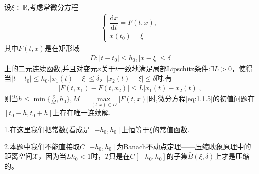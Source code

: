 \documentclass[../../main.tex]{subfiles}
\begin{document}
\begin{theorem}[常微分方程初值问题解的局部存在唯一性]\label{theorem:常微分方程初值问题解的局部存在唯一性}
设$\xi \in \mathbb{R}$,考虑常微分方程
\begin{align}
\label{eq:1.1.5}
\begin{cases}
\dfrac{\mathrm{d}x}{\mathrm{d}t} = F(t,x), \\
x(t_0) = \xi
\end{cases}
\end{align}
其中$F(t,x)$是在矩形域
\begin{align*}
D:\left| t-t_0 \right|\leqslant h_0,\left| x-\xi \right|\leqslant \delta 
\end{align*}
上的二元连续函数,并且对变元$x$关于$t$一致地满足局部Lipschitz条件:$\exists L > 0$，使得当$\left| t-t_0 \right|\leqslant h_0$,$|x_1(t) - \xi| \leqslant \delta$，$|x_2(t) - \xi| \leqslant \delta$时,有
\begin{align}
\label{eq:1.1.10}
|F(t, x_1) - F(t, x_2)| \leqslant L|x_1(t) - x_2(t)|,
\end{align}
则当$h \leqslant \min\{\frac{\delta}{M},h_0\},M=\underset{\left( t,x \right) \in D}{\max}\left| F\left( t,x \right) \right|$时,微分方程\eqref{eq:1.1.5}的初值问题在$[t_0-h,t_0+h]$上存在唯一连续解.
\end{theorem}
\begin{remark}

1.在这里我们把常数$\xi$看成是$[-h_0,h_0]$上恒等于$\xi$的常值函数.

2.本题中我们不能直接取$C[-h_0,h_0]$为\hyperref[theorem:Banach不动点定理——压缩映象原理]{Banach不动点定理——压缩映象原理}中的距离空间$\mathscr{X}$，因为当$Lh_0 < 1$时，$T$只是在$C[-h_0,h_0]$的子集$\bar{B}(\xi,\delta)$上才是压缩的。
\end{remark}
\end{document}

